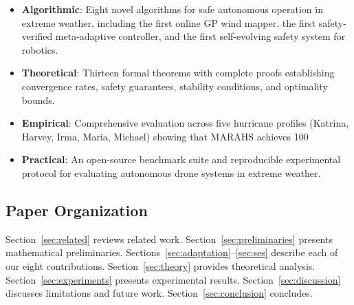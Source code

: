 \begin{itemize}
    \item \textbf{Algorithmic}: Eight novel algorithms for safe autonomous operation in extreme weather, including the first online GP wind mapper, the first safety-verified meta-adaptive controller, and the first self-evolving safety system for robotics.
    
    \item \textbf{Theoretical}: Thirteen formal theorems with complete proofs establishing convergence rates, safety guarantees, stability conditions, and optimality bounds.
    
    \item \textbf{Empirical}: Comprehensive evaluation across five hurricane profiles (Katrina, Harvey, Irma, Maria, Michael) showing that MARAHS achieves 100%
    
    \item \textbf{Practical}: An open-source benchmark suite and reproducible experimental protocol for evaluating autonomous drone systems in extreme weather.
\end{itemize}

\subsection{Paper Organization}

Section~\ref{sec:related} reviews related work. Section~\ref{sec:preliminaries} presents mathematical preliminaries. Sections~\ref{sec:adaptation}--\ref{sec:ses} describe each of our eight contributions. Section~\ref{sec:theory} provides theoretical analysis. Section~\ref{sec:experiments} presents experimental results. Section~\ref{sec:discussion} discusses limitations and future work. Section~\ref{sec:conclusion} concludes.
